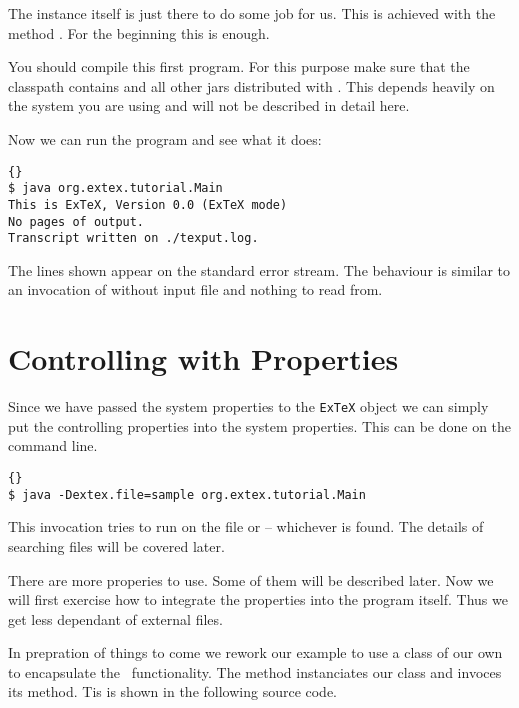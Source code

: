The instance itself is just there to do some job for us. This is
achieved with the method . For the beginning this is
enough. 

You should compile this first program. For this purpose make sure that
the classpath contains  and all other jars
distributed with \ExTeX. This depends heavily on the system you are
using and will not be described in detail here.

Now we can run the program and see what it does:

\begin{lstlisting}{}
$ java org.extex.tutorial.Main
This is ExTeX, Version 0.0 (ExTeX mode)
No pages of output.
Transcript written on ./texput.log.
\end{lstlisting}

The lines shown appear on the standard error stream. The behaviour is
similar to an invocation of \ExTeX{} without input file and nothing to
read from.

\section{Controlling \ExTeX{} with Properties}

Since we have passed the system properties to the \texttt{ExTeX}
object we can simply put the controlling properties into the system
properties. This can be done on the command line.

\begin{lstlisting}{}
$ java -Dextex.file=sample org.extex.tutorial.Main
\end{lstlisting}

This invocation tries to run \ExTeX{} on the file  or
 -- whichever is found. The details of searching
files will be covered later.

There are more properies to use. Some of them will be described later.
Now we will first exercise how to integrate the properties into the
program itself. Thus we get less dependant of external files.

In prepration of things to come we rework our example to use a class
of our own to encapsulate the \ExTeX\ functionality. The 
method instanciates our class and invoces its  method.
Tis is shown in the following source code.

